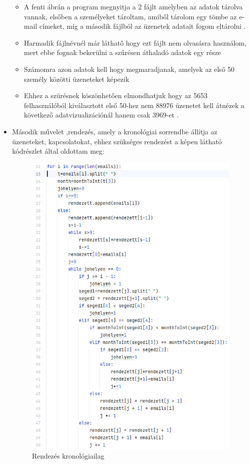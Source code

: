 \begin{itemize}
\begin{itemize}
        \item A fenti ábrán a program  megnyitja a 2 fájlt amelyben az adatok tárolva vannak, elsőben a személyeket tároltam, amiből tárolom egy tömbe az e-mail címeket, míg a második fájlból az üzenetek adatait fogom eltárolni .
        \item Harmadik fájlnévnél már láthatő hogy ezt fájlt nem olvasásra használom, mert ebbe fognak bekerülni a szűrésen áthaladó adatok egy része
        \item Számomra azon adatok kell hogy megmaradjanak, amelyek az első 50 személy közötti üzeneteket képezik 
        \item Ehhez a szürésnek köszönhetően elmondhatjuk hogy az 5653 felhasználóból kiválasztott első 50-hez nem 88976 üzenetet kell átnézek a következő adatvizualizációnál hanem csak 3969-et .
    \end{itemize}
    \item Második művelet ,rendezés, amely a kronológiai sorrendbe állítja az üzeneteket, kapcsolatokat, ehhez szükséges rendezést a képen látható kódrészlet által oldottam meg:
    \begin{figure}[!h]
        \centering
        \includegraphics[scale=0.8]{images/rendezes}
        \caption{Rendezés kronológiailag}
        

\end{figure}
\end{itemize}
